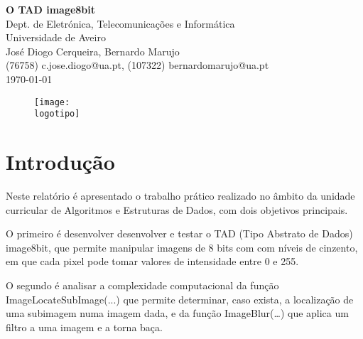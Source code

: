 \documentclass{report}
\begin{document}
%
\def\titulo{O TAD image8bit}
\def\data{\today}
\def\autores{José Diogo Cerqueira, Bernardo Marujo}
\def\autorescontactos{(76758) c.jose.diogo@ua.pt, (107322) bernardomarujo@ua.pt}
\def\departamento{Dept. de Eletrónica, Telecomunicações e Informática}
\def\empresa{Universidade de Aveiro}
\def\logotipo{ua.pdf}
%
%

%
%
\begin{titlepage}

\begin{center}
%
\vspace*{50mm}
%
{\Huge\textbf{\titulo}}\\
{\Large \departamento\\ \empresa}\\
%
\vspace{10mm}
%
%
{\LARGE \autores\\ \autorescontactos} \\ 
%
\vspace{10mm}
%
\data
%
\vspace{20mm}
%
\begin{figure}[h]
\center
\texttt{[image: \\logotipo]}
\end{figure}
%
\end{center}
%
\end{titlepage}


\tableofcontents



\clearpage
{}


\chapter{Introdução}

Neste relatório é apresentado o trabalho prático realizado no âmbito da unidade curricular de Algoritmos e Estruturas de Dados, com dois objetivos principais.
\par
O primeiro é desenvolver desenvolver e testar o TAD (Tipo Abstrato de Dados) image8bit, que permite manipular imagens de 8 bits com com níveis de cinzento, em que cada pixel pode tomar valores de intensidade entre 0 e 255.
\par
O segundo é analisar a complexidade computacional da função ImageLocateSubImage(...) que permite determinar, caso exista, a localização de uma subimagem numa imagem dada, e da função ImageBlur(…) que aplica um filtro a uma imagem e a torna baça.
\end{document}
